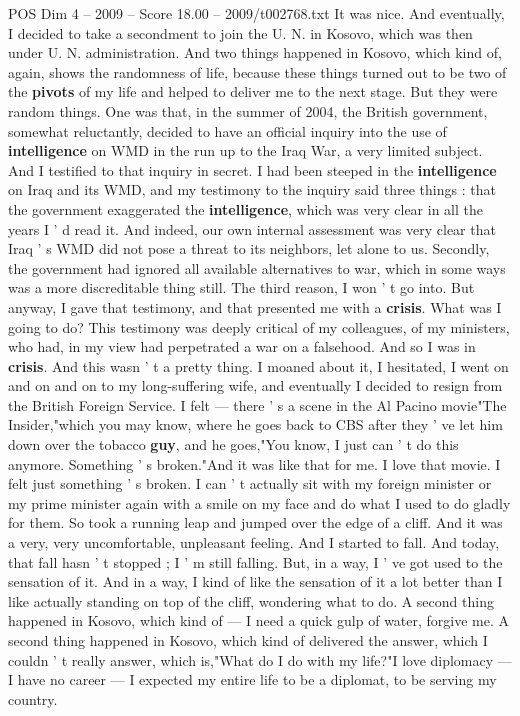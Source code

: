 \begin{textsample}{POS Dim 4 – 2009 – Score 18.00 – 2009/t002768.txt}
It was nice.
And eventually, I decided to take a secondment to join the U.
N. in Kosovo, which was then under U.
N. administration.
And two things happened in Kosovo, which kind of, again, shows the randomness of life, because these things turned out to be two of the \textbf{pivots} of my life and helped to deliver me to the next stage.
But they were random things.
One was that, in the summer of 2004, the British government, somewhat reluctantly, decided to have an official inquiry into the use of \textbf{intelligence} on WMD in the run up to the Iraq War, a very limited subject.
And I testified to that inquiry in secret.
I had been steeped in the \textbf{intelligence} on Iraq and its WMD, and my testimony to the inquiry said three things : that the government exaggerated the \textbf{intelligence}, which was very clear in all the years I ' d read it.
And indeed, our own internal assessment was very clear that Iraq ' s WMD did not pose a threat to its neighbors, let alone to us.
Secondly, the government had ignored all available alternatives to war, which in some ways was a more discreditable thing still.
The third reason, I won ' t go into.
But anyway, I gave that testimony, and that presented me with a \textbf{crisis}.
What was I going to do?
This testimony was deeply critical of my colleagues, of my ministers, who had, in my view had perpetrated a war on a falsehood.
And so I was in \textbf{crisis}.
And this wasn ' t a pretty thing.
I moaned about it, I hesitated, I went on and on and on to my long-suffering wife, and eventually I decided to resign from the British Foreign Service.
I felt — there ' s a scene in the Al Pacino movie"The Insider,"which you may know, where he goes back to CBS after they ' ve let him down over the tobacco \textbf{guy}, and he goes,"You know, I just can ' t do this anymore.
Something ' s broken."And it was like that for me.
I love that movie.
I felt just something ' s broken.
I can ' t actually sit with my foreign minister or my prime minister again with a smile on my face and do what I used to do gladly for them.
So took a running leap and jumped over the edge of a cliff.
And it was a very, very uncomfortable, unpleasant feeling.
And I started to fall.
And today, that fall hasn ' t stopped ; I ' m still falling.
But, in a way, I ' ve got used to the sensation of it.
And in a way, I kind of like the sensation of it a lot better than I like actually standing on top of the cliff, wondering what to do.
A second thing happened in Kosovo, which kind of — I need a quick gulp of water, forgive me.
A second thing happened in Kosovo, which kind of delivered the answer, which I couldn ' t really answer, which is,"What do I do with my life?"I love diplomacy — I have no career — I expected my entire life to be a diplomat, to be serving my country.

\end{textsample}
